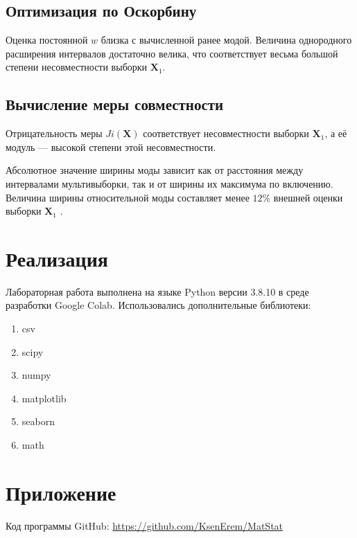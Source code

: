 \documentclass{article}
\begin{document}
\subsection{Оптимизация по Оскорбину}
Оценка постоянной $w$ близка с вычисленной ранее модой.
Величина однородного расширения интервалов  достаточно велика, что соответствует весьма большой степени несовместности выборки
$\textbf{X}_1$.
\subsection{Вычисление меры совместности}
Отрицательность меры $Ji(\textbf{X})$ соответствует несовместности выборки
$\textbf{X}_1$, а её модуль — высокой степени этой несовместности.

Абсолютное значение ширины моды зависит как от расстояния между интервалами мультивыборки, так и от ширины их максимума по включению. 
Величина ширины относительной моды составляет менее $12\%$ внешней оценки выборки $\textbf{X}_1$ . 

 \newpage	
 \section {Реализация} 	
\noindent Лабораторная работа выполнена на языке Python версии 3.8.10 в среде разработки Google Colab. Использовались дополнительные библиотеки:
\begin{enumerate}
    \item csv
    \item scipy
    \item numpy
    \item matplotlib
    \item seaborn
    \item math
\end{enumerate}

\section{Приложение}
\noindent Код программы GitHub: \url{https://github.com/KsenErem/MatStat}
\end{document}
